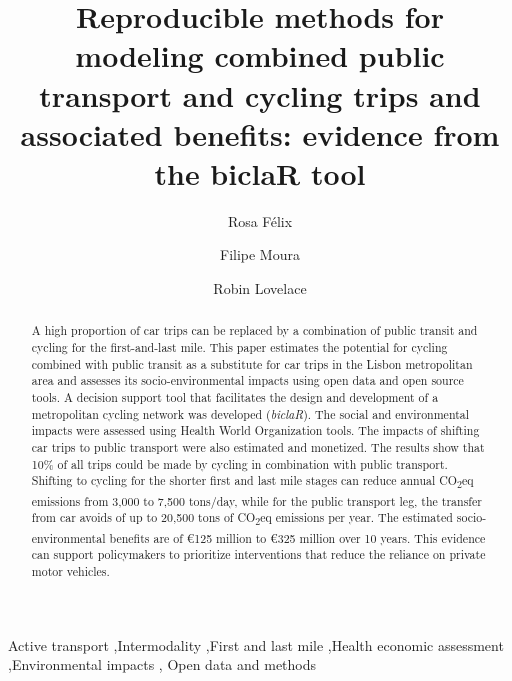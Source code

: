 \documentclass[review, doubleblind, 3p,
authoryear]{elsarticle} %
\begin{document}
\begin{frontmatter}

  \title{Reproducible methods for modeling combined public transport and
cycling trips and associated benefits: evidence from the biclaR tool}
    \author[CERIS]{Rosa Félix%
  }
    \author[CERIS]{Filipe Moura%
  }
    \author[ITS]{Robin Lovelace%
  }
  
  \begin{abstract}
  A high proportion of car trips can be replaced by a combination of
  public transit and cycling for the first-and-last mile. This paper
  estimates the potential for cycling combined with public transit as a
  substitute for car trips in the Lisbon metropolitan area and assesses
  its socio-environmental impacts using open data and open source tools.
  A decision support tool that facilitates the design and development of
  a metropolitan cycling network was developed (\emph{biclaR}). The
  social and environmental impacts were assessed using Health World
  Organization tools. The impacts of shifting car trips to public
  transport were also estimated and monetized. The results show that
  10\% of all trips could be made by cycling in combination with public
  transport. Shifting to cycling for the shorter first and last mile
  stages can reduce annual CO\textsubscript{2}eq emissions from 3,000 to
  7,500 tons/day, while for the public transport leg, the transfer from
  car avoids of up to 20,500 tons of CO\textsubscript{2}eq emissions per
  year. The estimated socio-environmental benefits are of €125 million
  to €325 million over 10 years. This evidence can support policymakers
  to prioritize interventions that reduce the reliance on private motor
  vehicles.\\
  \end{abstract}
    \begin{keyword}
    Active transport \sep Intermodality \sep First and last
mile \sep Health economic assessment \sep Environmental impacts \sep 
    Open data and methods
  \end{keyword}
  
 \end{frontmatter}
\end{document}
